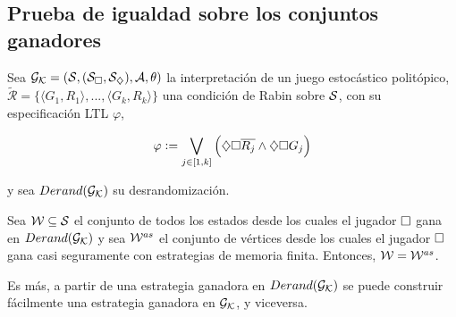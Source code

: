 \subsection{Prueba de igualdad sobre los conjuntos ganadores}

\begin{theorem}
	\label{teocuali}
	Sea $\mathcal{G}_{\mathcal{K}} = (\mathcal{S}, (\mathcal{S}_\square, \mathcal{S}_\diamondsuit), \mathcal{A}, \theta)$ la interpretación de un juego estocástico politópico, $\widetilde{\mathcal{R}} = \{ \langle G_1, R_1 \rangle, ..., \langle G_k, R_k \rangle \}$ una condición de Rabin sobre $\mathcal{S}$, con su especificación LTL $\varphi$,

	$$
		\varphi := \bigvee_{j \in [1, k]} \left( \diamondsuit \square \overline{R_j} \wedge \diamondsuit \square G_j \right)
	$$

	y sea $Derand(\mathcal{G}_{\mathcal{K}})$ su desrandomización.

	Sea $\mathcal{W} \subseteq \mathcal{S}$ el conjunto de todos los estados desde los cuales el
	jugador $\square$ gana en $Derand(\mathcal{G}_{\mathcal{K}})$ y sea $\mathcal{W}^{as}$ el conjunto de vértices desde
	los cuales el jugador $\square$ gana casi seguramente con estrategias de memoria
	finita. Entonces, $\mathcal{W} = \mathcal{W}^{as}$.

	Es más, a partir de una estrategia ganadora en $Derand(\mathcal{G}_{\mathcal{K}})$ se puede construir
	fácilmente una estrategia ganadora en $\mathcal{G}_{\mathcal{K}}$, y viceversa.
\end{theorem}

